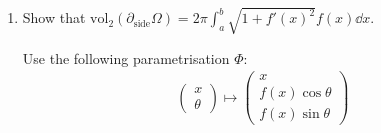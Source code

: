 \documentclass[12pt]{article}
\begin{document}
\begin{enumerate}
    Substitute $u := \frac{y}{v},\ \dd u = \frac{1}{v} \dd y \iff \dd y = v \dd u$:
    \[
        v \int_{-v}^{v} \sqrt{1-(\frac{y}{v})^2} \dd y = v^2 \int_{-1}^{1} \sqrt{1-u^2} \dd u
    \]

    Next, substitute $u = \sin \theta,\ \dd u = \cos \theta \dd \theta$:
    \begin{align*}
        v^2 \int_{-1}^{1} \sqrt{1-u^2} \dd u &= v^2 \int_{\sin^{-1}(-1)}^{\sin^{-1}(1)} \cos\theta \sqrt{1-\sin^2\theta} \dd \theta = v^2 \int_{-\frac{\pi}{2}}^{\frac{\pi}{2}} \cos^2\theta \dd \theta \\
    \end{align*}

    Use the power-reduction identity $\cos^2\theta = \frac{1 + \cos(2\theta)}{2}$:
    \begin{align*}
        v^2 \int_{-\frac{\pi}{2}}^{\frac{\pi}{2}} \cos^2\theta \dd \theta &= v^2 \int_{-\frac{\pi}{2}}^{\frac{\pi}{2}} \frac{1 + \cos(2\theta)}{2} \dd \theta = \frac{v^2}{2} \left[\int_{-\frac{\pi}{2}}^{\frac{\pi}{2}} \dd \theta + \int_{-\frac{\pi}{2}}^{\frac{\pi}{2}} \cos(2\theta) \dd \theta \right] \\
        &= \frac{\pi v^2}{2} + \frac{v^2}{2}\left[ \frac{1}{2}\sin(2\theta) \right]_{-\frac{\pi}{2}}^{\frac{\pi}{2}} = \frac{\pi v^2}{2} + \frac{v^2}{4} \left( \sin\pi - \sin(-\pi) \right) = \frac{\pi v^2}{2}
    \end{align*}

    So we have:
    \begin{align*}
        \mathrm{vol}_3(\Omega) &= 2 \int_{a}^{b} \frac{\pi}{2}f(x)^2 \dd x = \pi \int_{a}^{b} f(x)^2 \dd x
    \end{align*}

    which is what we wanted to show.

    \item Show that $\mathrm{vol}_2(\partial_{\text{side}}\Omega) = 2\pi\int_{a}^{b} \sqrt{1 + f'(x)^2}f(x) \dd x$.
    
    Use the following parametrisation $\Phi$:
    \begin{align*}
        \begin{pmatrix} 
            x \\ \theta
        \end{pmatrix}
        \mapsto
        \begin{pmatrix} 
            x \\ f(x)\cos\theta \\ f(x)\sin\theta
        \end{pmatrix}
    \end{align*}


\end{enumerate}
\end{document}
